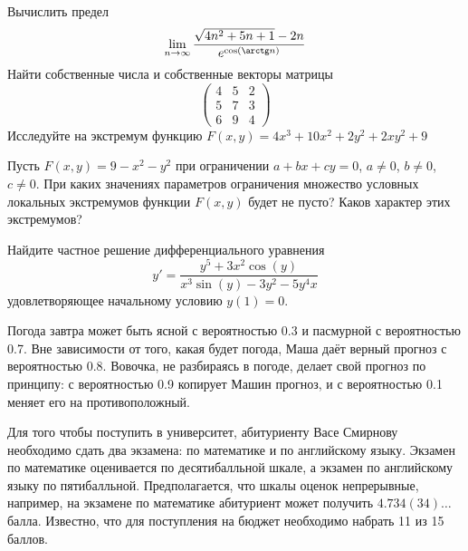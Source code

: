 \documentclass[addpoints, answers]{exam} %
\begin{document}
\begin{questions}

\question Вычислить предел 
\[
\lim_{n\to\infty} \frac{\sqrt{4n^2+5n+1}-2n}{e^{\cos(\arctg n)}}
\]
\question Найти собственные числа и собственные векторы матрицы
\[
\left(
\begin{array}{ccc}
4 & 5 & 2 \\
5 & 7 & 3 \\
6 & 9 & 4
\end{array}
\right)
\]
\question Исследуйте на экстремум функцию $F(x,y)=4x^3+10x^2+2y^2+2xy^2+9$

\question Пусть $F(x,y)=9-x^2-y^2$ при ограничении $a+bx+cy=0$, $a\neq 0$, $b\neq 0$, $c\neq 0$. При каких значениях параметров
ограничения множество условных локальных экстремумов функции $F(x,y)$ будет не
пусто? Каков характер этих экстремумов?

\question  Найдите частное решение дифференциального уравнения 
\[
y'=\frac{y^5+3x^2\cos(y)}{x^3\sin(y)-3y^2-5y^4x}
\]
удовлетворяющее начальному условию $y(1)=0$.

\question Погода завтра может быть ясной с вероятностью 0.3 и пасмурной с вероятностью 0.7.
Вне зависимости от того, какая будет погода, Маша даёт верный прогноз с вероятностью
0.8. Вовочка, не разбираясь в погоде, делает свой прогноз по принципу: с вероятностью
0.9 копирует Машин прогноз, и с вероятностью 0.1 меняет его на противоположный.


\question Для того чтобы поступить в университет, абитуриенту Васе Смирнову необходимо
сдать два экзамена: по математике и по английскому языку. Экзамен по математике
оценивается по десятибалльной шкале, а экзамен по английскому языку по пятибалльной.
Предполагается, что шкалы оценок непрерывные, например, на экзамене по математике
абитуриент может получить $4.734(34)\ldots$ балла. Известно, что для поступления на бюджет
необходимо набрать 11 из 15 баллов. 



\end{questions}
\end{document}

